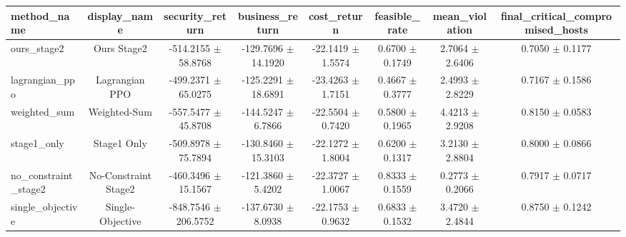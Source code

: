 \begin{tabular}{lccccccc}
\hline
method\_name & display\_name & security\_return & business\_return & cost\_return & feasible\_rate & mean\_violation & final\_critical\_compromised\_hosts \\
\hline
ours\_stage2 & Ours Stage2 & -514.2155 $\pm$ 58.8768 & -129.7696 $\pm$ 14.1920 & -22.1419 $\pm$ 1.5574 & 0.6700 $\pm$ 0.1749 & 2.7064 $\pm$ 2.6406 & 0.7050 $\pm$ 0.1177 \\
lagrangian\_ppo & Lagrangian PPO & -499.2371 $\pm$ 65.0275 & -125.2291 $\pm$ 18.6891 & -23.4263 $\pm$ 1.7151 & 0.4667 $\pm$ 0.3777 & 2.4993 $\pm$ 2.8229 & 0.7167 $\pm$ 0.1586 \\
weighted\_sum & Weighted-Sum & -557.5477 $\pm$ 45.8708 & -144.5247 $\pm$ 6.7866 & -22.5504 $\pm$ 0.7420 & 0.5800 $\pm$ 0.1965 & 4.4213 $\pm$ 2.9208 & 0.8150 $\pm$ 0.0583 \\
stage1\_only & Stage1 Only & -509.8978 $\pm$ 75.7894 & -130.8460 $\pm$ 15.3103 & -22.1272 $\pm$ 1.8004 & 0.6200 $\pm$ 0.1317 & 3.2130 $\pm$ 2.8804 & 0.8000 $\pm$ 0.0866 \\
no\_constraint\_stage2 & No-Constraint Stage2 & -460.3496 $\pm$ 15.1567 & -121.3860 $\pm$ 5.4202 & -22.3727 $\pm$ 1.0067 & 0.8333 $\pm$ 0.1559 & 0.2773 $\pm$ 0.2066 & 0.7917 $\pm$ 0.0717 \\
single\_objective & Single-Objective & -848.7546 $\pm$ 206.5752 & -137.6730 $\pm$ 8.0938 & -22.1753 $\pm$ 0.9632 & 0.6833 $\pm$ 0.1532 & 3.4720 $\pm$ 2.4844 & 0.8750 $\pm$ 0.1242 \\
\hline
\end{tabular}